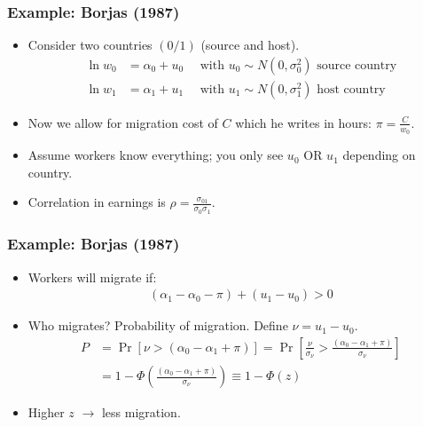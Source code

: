 \documentclass[aspectratio=169,11pt]{beamer}
\begin{document}
\begin{frame}
\frametitle{Example: Borjas (1987)}
\begin{itemize}
\item Consider two countries $(0/1)$ (source and host).
\begin{align*}
\ln w_0 &= \alpha_0 + u_0 \quad \mbox{ with } u_0 \sim N(0,\sigma_0^2) \mbox{ source country}\\
\ln w_1 &= \alpha_1 + u_1 \quad \mbox{ with } u_1 \sim N(0,\sigma_1^2) \mbox{ host country}
\end{align*}
\item Now we allow for migration cost of $C$ which he writes in hours: $\pi = \frac{C}{w_0}$.
\item Assume workers know everything; you only see $u_0$ \alert{OR} $u_1$ depending on country.
\item Correlation in earnings is $\rho=\frac{\sigma_{01}}{\sigma_{0} \sigma_{1}}$.
\end{itemize}
\end{frame}

\begin{frame}
\frametitle{Example: Borjas (1987)}
\begin{itemize}
\item Workers will migrate if:
\begin{align*}
\left( \alpha_{1}-\alpha_{0}-\pi\right)+\left(u_{1}-u_{0}\right)>0
\end{align*}
\item Who migrates? Probability of migration. Define $\nu = u_1-u_0$.
\begin{align*}
P &=\operatorname{Pr}\left[\nu>\left(\alpha_{0}-\alpha_{1}+\pi\right)\right] =\operatorname{Pr}\left[\frac{\nu}{\sigma_{\nu}}>\frac{\left(\alpha_{0}-\alpha_{1}+\pi\right)}{\sigma_{\nu}}\right] \\
&=1-\Phi\left(\frac{\left(\alpha_{0}-\alpha_{1}+\pi\right)}{\sigma_{\nu}}\right) \equiv 1-\Phi(z)
\end{align*}
\item Higher $z$ $\rightarrow$ less migration.
\end{itemize}
\end{frame}
\end{document}
